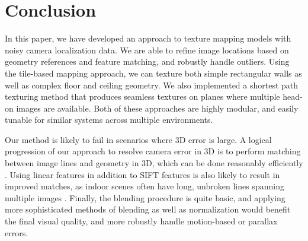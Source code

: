 \documentclass{llncs}
\begin{document}
\section{Conclusion}
\label{sec:conclusion}

In this paper, we have developed an approach to texture mapping models
with noisy camera localization data. We are able to refine image
locations based on geometry references and feature matching, and
robustly handle outliers. Using the tile-based mapping approach, we
can texture both simple rectangular walls as well as complex floor and
ceiling geometry. We also implemented a shortest path texturing method
that produces seamless textures on planes where multiple head-on
images are available. Both of these approaches are highly modular, and
easily tunable for similar systems across multiple environments.

Our method is likely to fail in scenarios where 3D error is large. A
logical progression of our approach to resolve camera error in 3D is
to perform matching between image lines and geometry in 3D, which can
be done reasonably efficiently \cite{linebased,
  rectangularstructures}. Using linear features in addition to SIFT
features is also likely to result in improved matches, as indoor
scenes often have long, unbroken lines spanning multiple images
\cite{linearposeestimation}. Finally, the blending procedure is quite
basic, and applying more sophisticated methods of blending as well as
normalization would benefit the final visual quality, and more
robustly handle motion-based or parallax errors.
\end{document}
